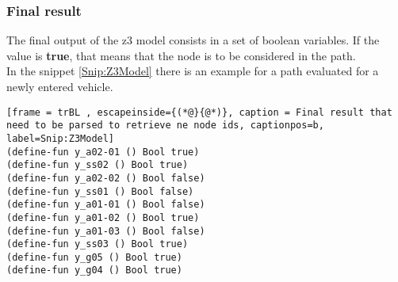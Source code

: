 \subsubsection{Final result}
The final output of the z3 model consists in a set of boolean variables. If the value is \textbf{true}, that means that the node is to be considered in the path.\\
In the snippet \ref{Snip:Z3Model} there is an example for a path evaluated for a newly entered vehicle.
\begin{lstlisting}[frame = trBL , escapeinside={(*@}{@*)}, caption = Final result that need to be parsed to retrieve ne node ids, captionpos=b, label=Snip:Z3Model]
(define-fun y_a02-01 () Bool true)
(define-fun y_ss02 () Bool true)
(define-fun y_a02-02 () Bool false)
(define-fun y_ss01 () Bool false)
(define-fun y_a01-01 () Bool false)
(define-fun y_a01-02 () Bool true)
(define-fun y_a01-03 () Bool false)
(define-fun y_ss03 () Bool true)
(define-fun y_g05 () Bool true)
(define-fun y_g04 () Bool true)
\end{lstlisting}

